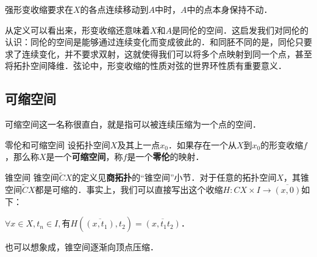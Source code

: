 强形变收缩要求在$X$的各点连续移动到$A$中时，$A$中的点本身保持不动．

从定义可以看出来，形变收缩还意味着$X$和$A$是同伦的空间．这启发我们对同伦的认识：同伦的空间是能够通过连续变化而变成彼此的．和同胚不同的是，同伦只要求了连续变化，并不要求双射，这就使得我们可以将多个点映射到同一个点，甚至将拓扑空间降维．弦论中，形变收缩的性质对弦的世界环性质有重要意义．

\subsection{可缩空间}
可缩空间这一名称很直白，就是指可以被连续压缩为一个点的空间．

\begin{definition}{零伦和可缩空间}
设拓扑空间$X$及其上一点$x_0$．如果存在一个从$X$到$x_0$的形变收缩$f$，那么称$X$是一个\textbf{可缩空间}，称$f$是一个\textbf{零伦}的映射．
\end{definition}

\begin{example}{锥空间}
锥空间$\widetilde{C}X$的定义见\textbf{商拓扑}的“锥空间”小节．对于任意的拓扑空间$X$，其锥空间$\widetilde{C}X$都是可缩的．事实上，我们可以直接写出这个收缩$H:CX\times I\rightarrow\overline{(x, 0)}$如下：

$\forall x\in X, t_n\in I, $有$H(\overline{(x, t_1)}, t_2)=\overline{(x, t_1t_2)}$．

也可以想象成，锥空间逐渐向顶点压缩．
\end{example}


